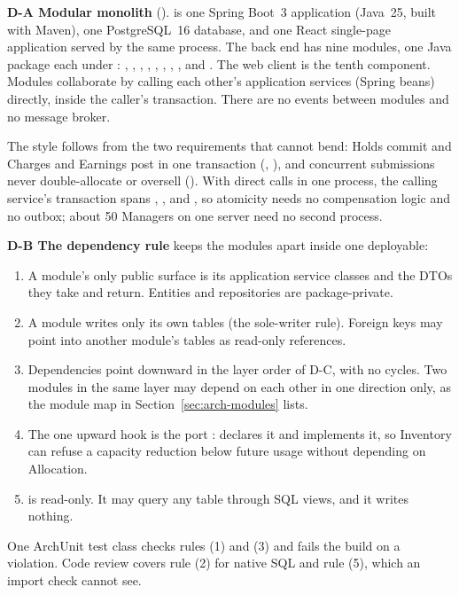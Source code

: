 \textbf{D-A Modular monolith} (). \SRSproduct{} is one Spring Boot~3 application (Java~25, built with Maven), one PostgreSQL~16 database, and one React single-page application served by the same process. The back end has nine modules, one Java package each under : , , , , , , , , and . The web client is the tenth component. Modules collaborate by calling each other's application services (Spring beans) directly, inside the caller's transaction. There are no events between modules and no message broker.

The style follows from the two requirements that cannot bend: Holds commit and Charges and Earnings post in one transaction (, ), and concurrent submissions never double-allocate or oversell (). With direct calls in one process, the calling service's transaction spans , , and , so atomicity needs no compensation logic and no outbox; about 50 Managers on one server need no second process.

\textbf{D-B The dependency rule} keeps the modules apart inside one deployable:
\begin{enumerate}[label=(\arabic*)]
  \item A module's only public surface is its application service classes and the DTOs they take and return. Entities and repositories are package-private.
  \item A module writes only its own tables (the sole-writer rule). Foreign keys may point into another module's tables as read-only references.
  \item Dependencies point downward in the layer order of D-C, with no cycles. Two modules in the same layer may depend on each other in one direction only, as the module map in Section~\ref{sec:arch-modules} lists.
  \item The one upward hook is the port :  declares it and  implements it, so Inventory can refuse a capacity reduction below future usage without depending on Allocation.
  \item {} is read-only. It may query any table through SQL views, and it writes nothing.
\end{enumerate}
One ArchUnit test class checks rules (1) and (3) and fails the build on a violation. Code review covers rule (2) for native SQL and rule (5), which an import check cannot see.

